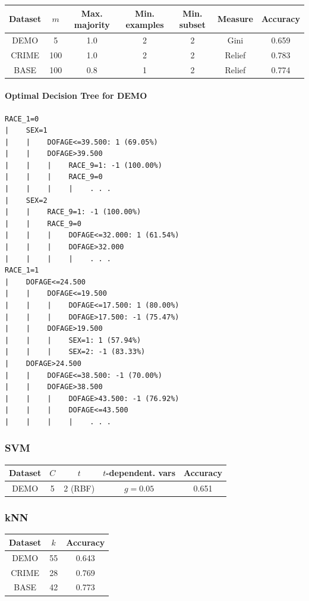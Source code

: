 \documentclass[11pt,letter]{article}
\begin{document}
\begin{tabular}{|c|c|c|c|c|c|c|}
\hline
Dataset & $m$ & Max. majority & Min. examples & Min. subset & Measure & Accuracy \\
\hline
DEMO & 5 & 1.0 & 2 & 2 & Gini & 0.659 \\
CRIME & 100 & 1.0 & 2 & 2 & Relief & 0.783 \\
BASE & 100 & 0.8 & 1 & 2 & Relief & 0.774 \\
\hline
\end{tabular}

\paragraph{Optimal Decision Tree for DEMO} %
\begin{verbatim}
RACE_1=0
|    SEX=1
|    |    DOFAGE<=39.500: 1 (69.05%)
|    |    DOFAGE>39.500
|    |    |    RACE_9=1: -1 (100.00%)
|    |    |    RACE_9=0
|    |    |    |    . . .
|    SEX=2
|    |    RACE_9=1: -1 (100.00%)
|    |    RACE_9=0
|    |    |    DOFAGE<=32.000: 1 (61.54%)
|    |    |    DOFAGE>32.000
|    |    |    |    . . .
RACE_1=1
|    DOFAGE<=24.500
|    |    DOFAGE<=19.500
|    |    |    DOFAGE<=17.500: 1 (80.00%)
|    |    |    DOFAGE>17.500: -1 (75.47%)
|    |    DOFAGE>19.500
|    |    |    SEX=1: 1 (57.94%)
|    |    |    SEX=2: -1 (83.33%)
|    DOFAGE>24.500
|    |    DOFAGE<=38.500: -1 (70.00%)
|    |    DOFAGE>38.500
|    |    |    DOFAGE>43.500: -1 (76.92%)
|    |    |    DOFAGE<=43.500
|    |    |    |    . . .
\end{verbatim}

\subsubsection{SVM}
\begin{tabular}{|c|c|c|c|c|}
\hline
Dataset & $C$ & $t$ & $t$-dependent. vars & Accuracy \\
\hline
DEMO & 5 & 2 (RBF) & $g=0.05$ & 0.651 \\
\hline
\end{tabular}

\subsubsection{kNN}
\begin{tabular}{|c|c|c|}
\hline
Dataset & $k$ & Accuracy \\
\hline
DEMO & 55 & 0.643 \\
CRIME & 28 & 0.769 \\
BASE & 42 & 0.773 \\
\hline
\end{tabular}
\end{document}
